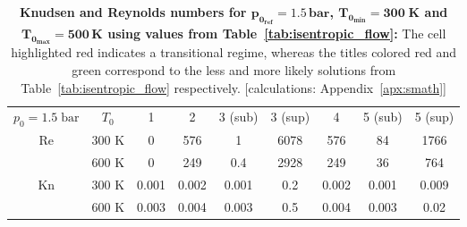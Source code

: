 \begin{table}[H]
    \centering
    \renewcommand{\arraystretch}{1.2}
    \begin{tabular}{|c|c|c|c|c|c|c|c|c|}
    \hline
    \multirow{2}{*}{\small $p_0 = 1.5\;\text{bar}$} 
        & \multirow{2}{*}{$T_0$} 
        & \multirow{2}{*}{1} 
        & \multirow{2}{*}{2} 
        & \multirow{2}{*}{\color{greenColor} 3 (sub)} 
        & \multirow{2}{*}{\color{redColor} 3 (sup)} 
        & \multirow{2}{*}{4} 
        & \multirow{2}{*}{\color{redColor} 5 (sub)} 
        & \multirow{2}{*}{\color{greenColor} 5 (sup)} \\
    & & & & & & & & \\ \hline

    \multirow{2}{*}{Re} 
      & 300 K 
          & 0 
          & 576 
          & 1 
          & \cellcolor[HTML]{FFADA8} 6078 
          & 576
          & 84
          & 1766 \\ \cline{2-9}
      & 600 K 
          & 0
          & 249 
          & 0.4 
          & \cellcolor[HTML]{FFADA8} 2928
          & 249 
          & 36
          & 764 \\ \hline

    \multirow{2}{*}{Kn} 
      & 300 K 
          & 0.001 
          & 0.002
          & 0.001
          & \cellcolor[HTML]{FFADA8} 0.2 
          & 0.002
          & 0.001
          & 0.009 \\ \cline{2-9}
      & 600 K 
          & 0.003 
          & 0.004
          & 0.003
          & \cellcolor[HTML]{FFADA8} 0.5
          & 0.004
          & 0.003
          & 0.02 \\ \hline
    \end{tabular}
    \caption[Knudsen and Reynolds numbers for $p_{0_{ref}} = 1.5\,\mathrm{bar}$, $T_{0_{min}} = 300 \text{K}$ and $T_{0_{max}} 600\,\mathrm{K}$ using values from table~\ref{tab:isentropic_flow}.]{
        \textbf{\textbf{Knudsen and Reynolds numbers for $\mathbf{p_{0_{ref}} = 1.5\,\text{bar}}$, $\mathbf{T_{0_{min}} = 300\;\text{K}}$ and $\mathbf{T_{0_{max}} = 500\,\text{K}}$ using values from Table~\ref{tab:isentropic_flow}:}}
        The cell highlighted red indicates a transitional regime, whereas the titles colored red and green correspond to the less and more likely solutions from Table~\ref{tab:isentropic_flow} respectively.
        [calculations: Appendix~\ref{apx:smath}]
    }
    \label{tab:test-knudsen-reynolds-isentropic}
\end{table}
